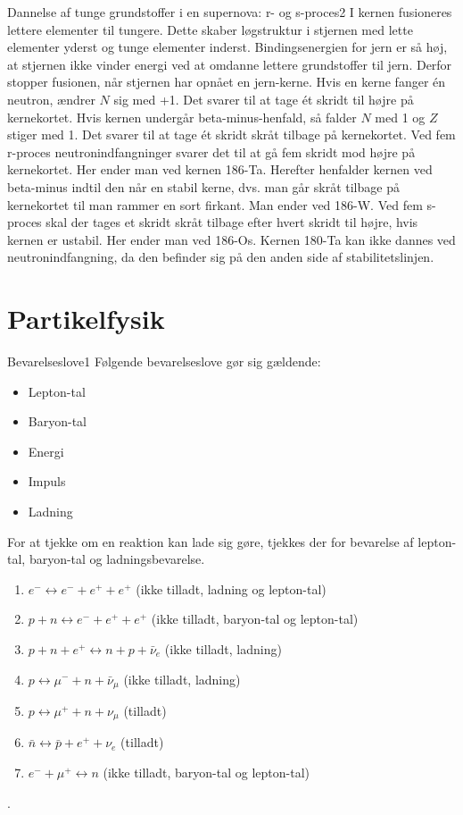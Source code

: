 \begin{opgave}{Dannelse af tunge grundstoffer i en supernova: r- og s-proces}{2}
\opg I kernen fusioneres lettere elementer til tungere. Dette skaber løgstruktur i stjernen med lette elementer yderst og tunge elementer inderst. Bindingsenergien for jern er så høj, at stjernen ikke vinder energi ved at omdanne lettere grundstoffer til jern. Derfor stopper fusionen, når stjernen har opnået en jern-kerne.
\opg Hvis en kerne fanger én neutron, ændrer $N$ sig med +1. Det svarer til at tage ét skridt til højre på kernekortet. Hvis kernen undergår beta-minus-henfald, så falder $N$ med 1 og $Z$ stiger med 1. Det svarer til at tage ét skridt skråt tilbage på kernekortet.
\opg Ved fem r-proces neutronindfangninger svarer det til at gå fem skridt mod højre på kernekortet. Her ender man ved kernen 186-Ta. Herefter henfalder kernen ved beta-minus indtil den når en stabil kerne, dvs. man går skråt tilbage på kernekortet til man rammer en sort firkant. Man ender ved 186-W.
\opg Ved fem s-proces skal der tages et skridt skråt tilbage efter hvert skridt til højre, hvis kernen er ustabil. Her ender man ved 186-Os.
\opg Kernen 180-Ta kan ikke dannes ved neutronindfangning, da den befinder sig på den anden side af stabilitetslinjen.
\end{opgave}

\newpage
\section*{Partikelfysik}

\begin{opgave}{Bevarelseslove}{1}
\opg Følgende bevarelseslove gør sig gældende:
\begin{itemize}
\item Lepton-tal
\item Baryon-tal
\item Energi
\item Impuls
\item Ladning
\end{itemize}
For at tjekke om en reaktion kan lade sig gøre, tjekkes der for bevarelse af lepton-tal, baryon-tal og ladningsbevarelse.
\opg
\begin{enumerate}
\item $e^- \longleftrightarrow e^- + e^+ + e^+$ (ikke tilladt, ladning og lepton-tal)
\item $p + n \longleftrightarrow e^- + e^+ + e^+$ (ikke tilladt, baryon-tal og lepton-tal)
\item $p + n + e^+ \longleftrightarrow n + p + \bar{\nu}_e$ (ikke tilladt, ladning)
\item $p \longleftrightarrow \mu^- + n + \bar{\nu}_\mu $ (ikke tilladt, ladning)
\item $p \longleftrightarrow \mu^+ + n + \nu_\mu $ (tilladt)
\item $\bar{n} \longleftrightarrow \bar{p} + e^+ + \nu_e$ (tilladt)
\item $e^- + \mu^+ \longleftrightarrow n$ (ikke tilladt, baryon-tal og lepton-tal)
\end{enumerate}
.
\end{opgave}

